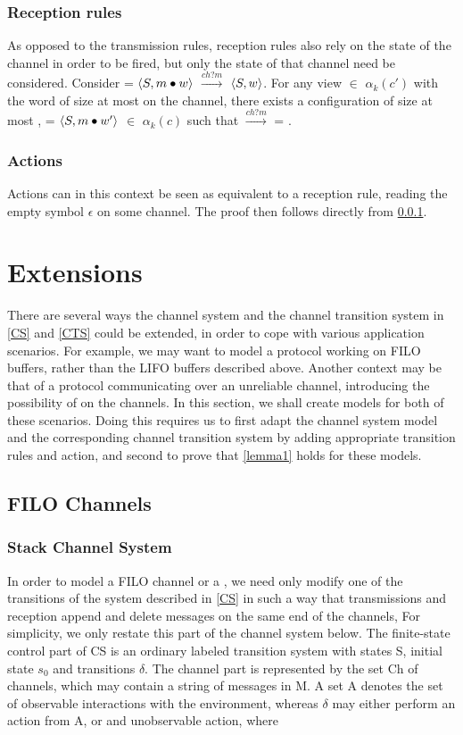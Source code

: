 \subsubsection{Reception rules}
\label{proofreception}
As opposed to the transmission rules, reception rules also rely on the state of the channel in order to be fired, but only the state of that channel need be considered. Consider  = $\langle S, m\bullet w\rangle$ $\xrightarrow{ch?m}$ $\langle S, w\rangle$. For any view  $\in$ $\alpha_k(c')$ with the word  of size at most  on the channel, there exists a configuration of size at most ,  = $\langle S, m\bullet w'\rangle$ $\in$ $\alpha_k(c)$ such that  $\xrightarrow{ch?m}$  = .

\subsubsection{Actions}
Actions can in this context be seen as equivalent to a reception rule, reading the empty symbol $\epsilon$ on some channel. The proof then follows directly from \ref{proofreception}.



\section{Extensions}
There are several ways the channel system and the channel transition system in \ref{CS} and \ref{CTS} could be extended, in order to cope with various application scenarios. For example, we may want to model a protocol working on FILO buffers, rather than the LIFO buffers described above. Another context may be that of a protocol communicating over an unreliable channel, introducing the possibility of  on the channels. In this section, we shall create models for both of these scenarios. Doing this requires us to first adapt the channel system model and the corresponding channel transition system by adding appropriate transition rules and action, and second to prove that \ref{lemma1} holds for these models.

\subsection{FILO Channels}
\subsubsection{Stack Channel System}
\label{StackCS}
In order to model a FILO channel or a , we need only modify one of the transitions of the system described in \ref{CS} in such a way that transmissions and reception append and delete messages on the same end of the channels, For simplicity, we only restate this part of the channel system below. The finite-state control part of CS is an ordinary labeled transition system with states S, initial state $s_0$ and transitions $\delta$. The channel part is represented by the set Ch of channels, which may contain a string of messages in M. A set A denotes the set of observable interactions with the environment, whereas $\delta$ may either perform an action from A, or and unobservable action, where

